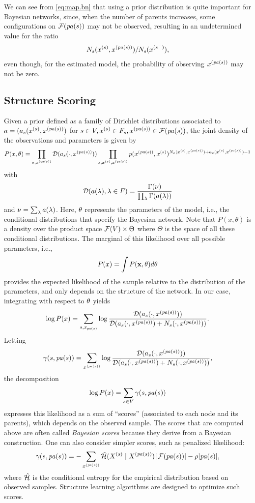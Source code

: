 We can see from \cref{eq:map.bn} that using a prior distribution is
quite important for Bayesian networks, since, when the number of
parents increases, some configurations on ${\mathcal F}({\mathit{pa}(s)})$ may not be
observed, resulting in an undetermined value for the ratio 
\[
N_s(x^{(s)}, x^{({\mathit{pa}(s)})})/N_s(x^{(s^{-})}), 
\]
even though, for the estimated model, the
probability of observing $x^{({\mathit{pa}(s)})}$ may not be zero.

\subsection{Structure Scoring}
Given a prior defined as a family of Dirichlet distributions associated to $a = (a_s(x^{(s)}, x^{({\mathit{pa}(s)})})$ for $s\in
V, x^{(s)}\in F_s, x^{({\mathit{pa}(s)})}\in {\mathcal F}({\mathit{pa}(s)})$, the joint density of the
observations and parameters is given by
\[
P( x, \theta) = \prod_{s, x^{({\mathit{pa}(s)})}} \mathcal D(a_s(\cdot, x^{({\mathit{pa}(s)})}))
\prod_{s, x^{(s)}, x^{({\mathit{pa}(s)})}} p(x^{({\mathit{pa}(s)})}, x^{(s)})^{N_s(x^{(s)}, x^{({\mathit{pa}(s)})}) +
  a_s(x^{(s)}, x^{({\mathit{pa}(s)})}) -1}
\] 
with 
\[
\mathcal D(a(\lambda), \lambda\in F) = \frac{\Gamma(\nu)}{\prod_\lambda \Gamma(a(\lambda))}
\]
and $\nu = \sum_\lambda a(\lambda)$. Here, $\theta$ represents the parameters of the model, i.e., the conditional distributions
that specify the Bayesian network. Note that $P(x, \theta)$ is a density over the product space ${\mathcal F}(V) \times \Theta$ where $\Theta$ is the space of all these conditional distributions.
The marginal of this likelihood over all
possible parameters, i.e., 
\[
P( x) = \int P(\mathbf x, \theta) d\theta
\]
provides the expected likelihood of the sample relative to the
distribution of the parameters, and only depends on the structure of
the network. In our case, integrating with respect to $\theta$ yields
\[
\log P( x) = \sum_{s, x_{{\mathit{pa}(s)}}} \log \frac {\mathcal D(a_s(\cdot,
x^{({\mathit{pa}(s)})}))}{\mathcal D(a_s(\cdot,
x^{({\mathit{pa}(s)})}) + N_s(\cdot, x^{({\mathit{pa}(s)})}))}.
\]
Letting 
\[
\gamma(s, {\mathit{pa}(s)}) = \sum_{x^{({\mathit{pa}(s)})}} \log \frac {\mathcal D(a_s(\cdot,
x^{({\mathit{pa}(s)})}))}{\mathcal D(a_s(\cdot,
x^{({\mathit{pa}(s)})}) + N_s(\cdot, x^{({\mathit{pa}(s)})}))},
\]
the decomposition
\[
\log P( x) = \sum_{s\in V} \gamma(s, {\mathit{pa}(s)})
\]
expresses this likelihood as a sum of ``scores'' (associated to each node
and its parents), which depends on the observed sample. The scores
that are computed above are often called {\em Bayesian scores} because
they derive from a Bayesian construction. One can also consider 
simpler scores, such as penalized likelihood:
\[
\gamma(s, {\mathit{pa}(s)}) = - \sum_{x^{({\mathit{pa}(s)})}} \hat {{\mathcal H}}(X^{(s)}\mid X^{({\mathit{pa}(s)})})\, |{\mathcal F}({\mathit{pa}(s)})| - \rho |{\mathit{pa}(s)}|,
\]  
where $\hat {{\mathcal H}}$ is the conditional entropy for the empirical
distribution based on observed samples. Structure learning algorithms \citep{neapolitan2004learning,koller2009probabilistic} are designed to optimize such scores. 



